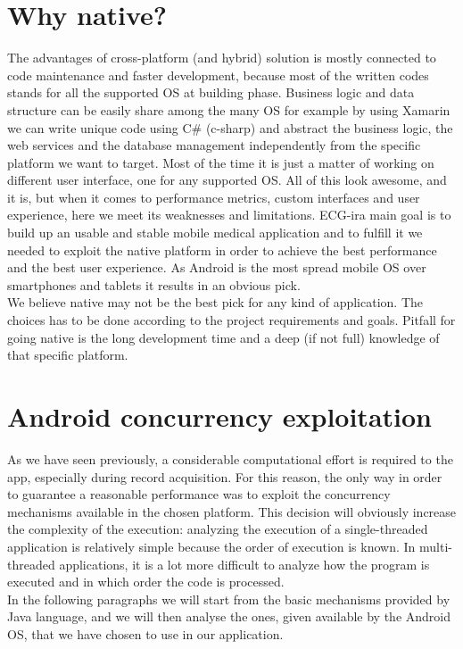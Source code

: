 \section{Why native?}
The advantages of cross-platform (and hybrid) solution is mostly connected to code maintenance and faster development, because most of the written codes stands for all the supported OS at building phase. Business logic and data structure can be easily share among the many OS for example by using Xamarin we can write unique code using C\# (c-sharp) and abstract the business logic, the web services and the database management independently from the specific platform we want to target.  Most of the time it is just a matter of working on different user interface, one for any supported OS. All of this look awesome, and it is, but when it comes to performance metrics, custom interfaces and user experience, here we meet its weaknesses and limitations. ECG-ira main goal is to build up an usable and stable mobile medical application and to fulfill it we needed to exploit the native platform in order to achieve the best performance and the best user experience. As Android is the most spread mobile OS over smartphones and tablets it results in an obvious pick.\\
We believe native may not be the best pick for any kind of application. The choices has to be done according to the project requirements and goals. Pitfall for going native is the long development time and a deep (if not full) knowledge of that specific platform.

\section{Android concurrency exploitation}
As we have seen previously, a considerable computational effort is required to the app, especially during record acquisition. For this reason, the only way in order to guarantee a reasonable performance was to exploit the concurrency mechanisms available in the chosen platform. This decision will obviously increase the complexity of the execution: analyzing the execution of a single-threaded application is relatively simple because the order of execution is known. In multi-threaded applications, it is a lot more difficult to analyze how the program is executed and in which order the code is processed.\\
In the following paragraphs we will start from the basic mechanisms provided by Java language, and we will then analyse the ones, given available by the Android OS, that we have chosen to use in our application.

